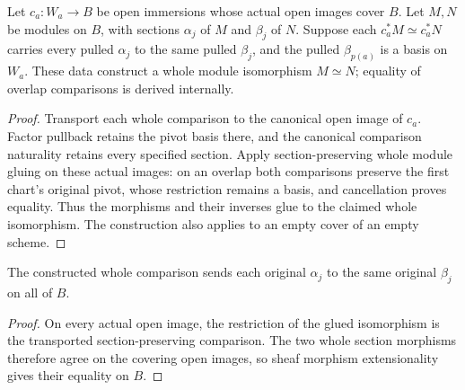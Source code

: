 \begin{definition}
\label{def:whole-module-open-immersion-cover-gluing}
\leanok
{}
Let $c_a:W_a\to B$ be open immersions whose actual open images cover $B$. Let $M,N$ be modules on $B$, with sections $\alpha_j$ of $M$ and $\beta_j$ of $N$. Suppose each $c_a^*M\simeq c_a^*N$ carries every pulled $\alpha_j$ to the same pulled $\beta_j$, and the pulled $\beta_{p(a)}$ is a basis on $W_a$. These data construct a whole module isomorphism $M\simeq N$; equality of overlap comparisons is derived internally.
\end{definition}
\begin{proof}
Transport each whole comparison to the canonical open image of $c_a$. Factor pullback retains the pivot basis there, and the canonical comparison naturality retains every specified section. Apply section-preserving whole module gluing on these actual images: on an overlap both comparisons preserve the first chart's original pivot, whose restriction remains a basis, and cancellation proves equality. Thus the morphisms and their inverses glue to the claimed whole isomorphism. The construction also applies to an empty cover of an empty scheme.
\end{proof}

\begin{proposition}
\label{prop:whole-module-open-immersion-cover-sections}
\leanok
{}
The constructed whole comparison sends each original $\alpha_j$ to the same original $\beta_j$ on all of $B$.
\end{proposition}
\begin{proof}
On every actual open image, the restriction of the glued isomorphism is the transported section-preserving comparison. The two whole section morphisms therefore agree on the covering open images, so sheaf morphism extensionality gives their equality on $B$.
\end{proof}
